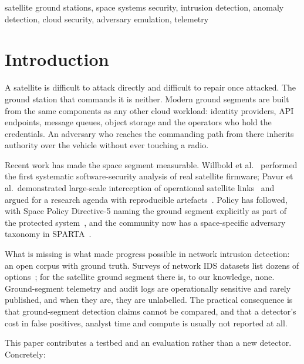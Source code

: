 \documentclass[conference]{IEEEtran}
\begin{document}
\begin{IEEEkeywords}
satellite ground stations, space systems security, intrusion detection, anomaly
detection, cloud security, adversary emulation, telemetry
\end{IEEEkeywords}

\section{Introduction}

A satellite is difficult to attack directly and difficult to repair once
attacked. The ground station that commands it is neither. Modern ground segments
are built from the same components as any other cloud workload: identity
providers, API endpoints, message queues, object storage and the operators who
hold the credentials. An adversary who reaches the commanding path from there
inherits authority over the vehicle without ever touching a radio.

Recent work has made the space segment measurable. Willbold et
al.~\cite{willbold2023space} performed the first systematic software-security
analysis of real satellite firmware; Pavur et al.\ demonstrated large-scale
interception of operational satellite links~\cite{pavur2020vsat} and argued for
a research agenda with reproducible artefacts~\cite{pavur2020sok}. Policy has
followed, with Space Policy Directive-5 naming the ground segment explicitly as
part of the protected system~\cite{spd5}, and the community now has a
space-specific adversary taxonomy in SPARTA~\cite{sparta}.

What is missing is what made progress possible in network intrusion
detection: an open corpus with ground truth. Surveys of network IDS datasets
list dozens of options~\cite{ring2019datasets}; for the satellite ground segment
there is, to our knowledge, none. Ground-segment telemetry and audit logs are
operationally sensitive and rarely published, and when they are, they are
unlabelled. The practical consequence is that ground-segment detection claims
cannot be compared, and that a detector's cost in false positives, analyst
time and compute is usually not reported at all.

This paper contributes a testbed and an evaluation rather than a new detector.
Concretely:
\end{document}
